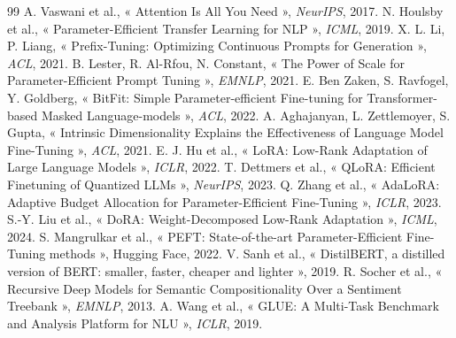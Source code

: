 \documentclass[11pt,a4paper]{article}
\begin{document}


\begin{thebibliography}{99}\small
{} A. Vaswani et al., « Attention Is All You Need », \emph{NeurIPS}, 2017.
 N. Houlsby et al., « Parameter-Efficient Transfer Learning for NLP », \emph{ICML}, 2019.
 X. L. Li, P. Liang, « Prefix-Tuning: Optimizing Continuous Prompts for Generation », \emph{ACL}, 2021.
 B. Lester, R. Al-Rfou, N. Constant, « The Power of Scale for Parameter-Efficient Prompt Tuning », \emph{EMNLP}, 2021.
 E. Ben Zaken, S. Ravfogel, Y. Goldberg, « BitFit: Simple Parameter-efficient Fine-tuning for Transformer-based Masked Language-models », \emph{ACL}, 2022.
 A. Aghajanyan, L. Zettlemoyer, S. Gupta, « Intrinsic Dimensionality Explains the Effectiveness of Language Model Fine-Tuning », \emph{ACL}, 2021.
 E. J. Hu et al., « LoRA: Low-Rank Adaptation of Large Language Models », \emph{ICLR}, 2022.
 T. Dettmers et al., « QLoRA: Efficient Finetuning of Quantized LLMs », \emph{NeurIPS}, 2023.
 Q. Zhang et al., « AdaLoRA: Adaptive Budget Allocation for Parameter-Efficient Fine-Tuning », \emph{ICLR}, 2023.
 S.-Y. Liu et al., « DoRA: Weight-Decomposed Low-Rank Adaptation », \emph{ICML}, 2024.
 S. Mangrulkar et al., « PEFT: State-of-the-art Parameter-Efficient Fine-Tuning methods », Hugging Face, 2022.
 V. Sanh et al., « DistilBERT, a distilled version of BERT: smaller, faster, cheaper and lighter », 2019.
 R. Socher et al., « Recursive Deep Models for Semantic Compositionality Over a Sentiment Treebank », \emph{EMNLP}, 2013.
 A. Wang et al., « GLUE: A Multi-Task Benchmark and Analysis Platform for NLU », \emph{ICLR}, 2019.
\end{thebibliography}
\end{document}
